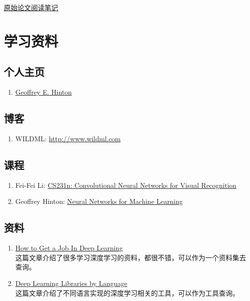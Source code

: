 \href{https://blog.csdn.net/stdcoutzyx/article/details/49022443}{原始论文阅读笔记}


\section{学习资料}

\subsection{个人主页}
\begin{enumerate}
\item \href{http://www.cs.toronto.edu/~hinton/}{Geoffrey E. Hinton}
\end{enumerate}


\subsection{博客}
\begin{enumerate}
\item WILDML: \url{http://www.wildml.com}
\end{enumerate}

\subsection{课程}

\begin{enumerate}
\item Fei-Fei Li: \href{http://cs231n.stanford.edu}{CS231n: Convolutional Neural Networks for Visual Recognition}

\item Geoffrey Hinton: \href{https://www.coursera.org/learn/neural-networks}{Neural Networks for Machine Learning}

\end{enumerate}




\subsection{资料}
\begin{enumerate}
\item \href{http://blog.deepgram.com/how-to-get-a-job-in-deep-learning/}{How to Get a Job In Deep Learning}\\
这篇文章介绍了很多学习深度学习的资料，都很不错，可以作为一个资料集去查询。

\item \href{http://www.teglor.com/b/deep-learning-libraries-language-cm569/}{Deep Learning Libraries by Language}\\
这篇文章介绍了不同语言实现的深度学习相关的工具，可以作为工具查询。

\end{enumerate}



